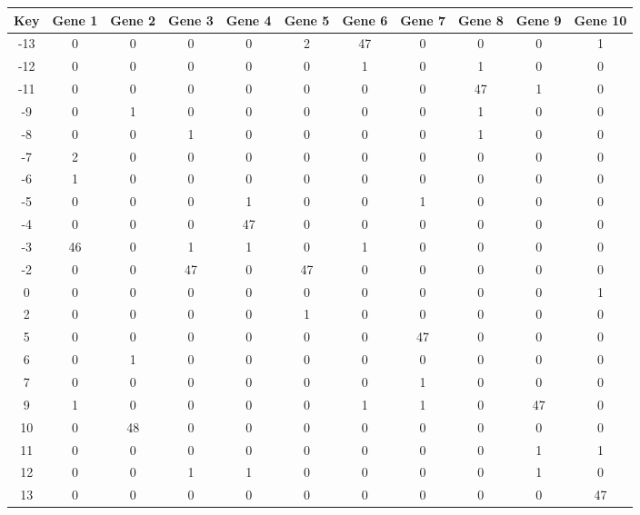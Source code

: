 \begin{tabular}{|c|c|c|c|c|c|c|c|c|c|c|}
\hline
Key & Gene 1 & Gene 2 & Gene 3 & Gene 4 & Gene 5 & Gene 6 & Gene 7 & Gene 8 & Gene 9 & Gene 10 \\
\hline
-13 & 0 & 0 & 0 & 0 & 2 & 47 & 0 & 0 & 0 & 1 \\
-12 & 0 & 0 & 0 & 0 & 0 & 1 & 0 & 1 & 0 & 0 \\
-11 & 0 & 0 & 0 & 0 & 0 & 0 & 0 & 47 & 1 & 0 \\
-9 & 0 & 1 & 0 & 0 & 0 & 0 & 0 & 1 & 0 & 0 \\
-8 & 0 & 0 & 1 & 0 & 0 & 0 & 0 & 1 & 0 & 0 \\
-7 & 2 & 0 & 0 & 0 & 0 & 0 & 0 & 0 & 0 & 0 \\
-6 & 1 & 0 & 0 & 0 & 0 & 0 & 0 & 0 & 0 & 0 \\
-5 & 0 & 0 & 0 & 1 & 0 & 0 & 1 & 0 & 0 & 0 \\
-4 & 0 & 0 & 0 & 47 & 0 & 0 & 0 & 0 & 0 & 0 \\
-3 & 46 & 0 & 1 & 1 & 0 & 1 & 0 & 0 & 0 & 0 \\
-2 & 0 & 0 & 47 & 0 & 47 & 0 & 0 & 0 & 0 & 0 \\
0 & 0 & 0 & 0 & 0 & 0 & 0 & 0 & 0 & 0 & 1 \\
2 & 0 & 0 & 0 & 0 & 1 & 0 & 0 & 0 & 0 & 0 \\
5 & 0 & 0 & 0 & 0 & 0 & 0 & 47 & 0 & 0 & 0 \\
6 & 0 & 1 & 0 & 0 & 0 & 0 & 0 & 0 & 0 & 0 \\
7 & 0 & 0 & 0 & 0 & 0 & 0 & 1 & 0 & 0 & 0 \\
9 & 1 & 0 & 0 & 0 & 0 & 1 & 1 & 0 & 47 & 0 \\
10 & 0 & 48 & 0 & 0 & 0 & 0 & 0 & 0 & 0 & 0 \\
11 & 0 & 0 & 0 & 0 & 0 & 0 & 0 & 0 & 1 & 1 \\
12 & 0 & 0 & 1 & 1 & 0 & 0 & 0 & 0 & 1 & 0 \\
13 & 0 & 0 & 0 & 0 & 0 & 0 & 0 & 0 & 0 & 47 \\
\hline
\end{tabular}